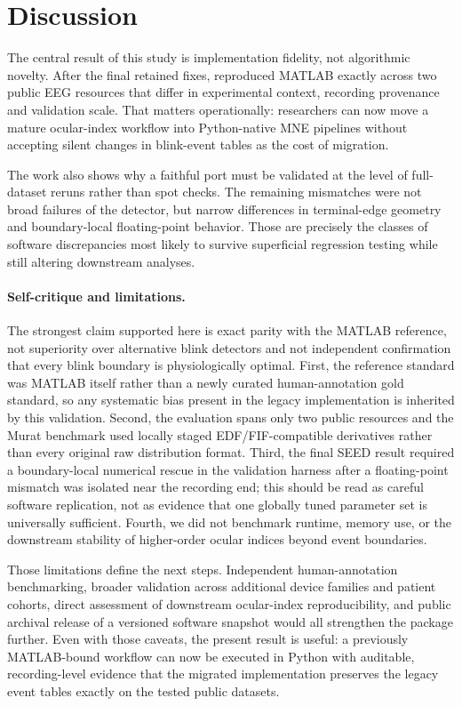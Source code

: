 \section{Discussion}

The central result of this study is implementation fidelity, not algorithmic novelty. After the final retained fixes, \tool{} reproduced MATLAB \blinker{} exactly across two public EEG resources that differ in experimental context, recording provenance and validation scale. That matters operationally: researchers can now move a mature ocular-index workflow into Python-native MNE pipelines without accepting silent changes in blink-event tables as the cost of migration.\supercite{gramfort2013,appelhoff2019}

The work also shows why a faithful port must be validated at the level of full-dataset reruns rather than spot checks. The remaining mismatches were not broad failures of the detector, but narrow differences in terminal-edge geometry and boundary-local floating-point behavior. Those are precisely the classes of software discrepancies most likely to survive superficial regression testing while still altering downstream analyses.

\paragraph{Self-critique and limitations.}
The strongest claim supported here is exact parity with the MATLAB reference, not superiority over alternative blink detectors and not independent confirmation that every blink boundary is physiologically optimal. First, the reference standard was MATLAB \blinker{} itself rather than a newly curated human-annotation gold standard, so any systematic bias present in the legacy implementation is inherited by this validation. Second, the evaluation spans only two public resources and the Murat benchmark used locally staged EDF/FIF-compatible derivatives rather than every original raw distribution format. Third, the final SEED result required a boundary-local numerical rescue in the validation harness after a floating-point mismatch was isolated near the recording end; this should be read as careful software replication, not as evidence that one globally tuned parameter set is universally sufficient. Fourth, we did not benchmark runtime, memory use, or the downstream stability of higher-order ocular indices beyond event boundaries.

Those limitations define the next steps. Independent human-annotation benchmarking, broader validation across additional device families and patient cohorts, direct assessment of downstream ocular-index reproducibility, and public archival release of a versioned software snapshot would all strengthen the package further. Even with those caveats, the present result is useful: a previously MATLAB-bound workflow can now be executed in Python with auditable, recording-level evidence that the migrated implementation preserves the legacy event tables exactly on the tested public datasets.
